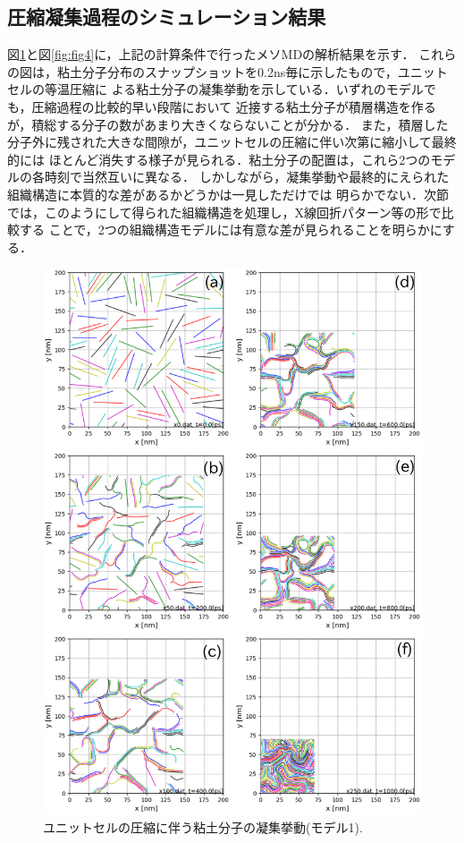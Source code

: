 \subsection{圧縮凝集過程のシミュレーション結果}
図\ref{fig:fig3}と図\ref{fig:fig4}に，上記の計算条件で行ったメソMDの解析結果を示す．
これらの図は，粘土分子分布のスナップショットを0.2ns毎に示したもので，ユニットセルの等温圧縮に
よる粘土分子の凝集挙動を示している．いずれのモデルでも，圧縮過程の比較的早い段階において
近接する粘土分子が積層構造を作るが，積総する分子の数があまり大きくならないことが分かる．
また，積層した分子外に残された大きな間隙が，ユニットセルの圧縮に伴い次第に縮小して最終的には
ほとんど消失する様子が見られる．粘土分子の配置は，これら2つのモデルの各時刻で当然互いに異なる．
しかしながら，凝集挙動や最終的にえられた組織構造に本質的な差があるかどうかは一見しただけでは
明らかでない．次節では，このようにして得られた組織構造を処理し，X線回折パターン等の形で比較する
ことで，2つの組織構造モデルには有意な差が見られることを明らかにする．
\begin{figure}[h]
	\begin{center}
	\includegraphics[width=1.0\linewidth]{Figs/fig3.eps} 
	\end{center}
	\caption{
		ユニットセルの圧縮に伴う粘土分子の凝集挙動(モデル1).
	} 
	\label{fig:fig3}
\end{figure}
